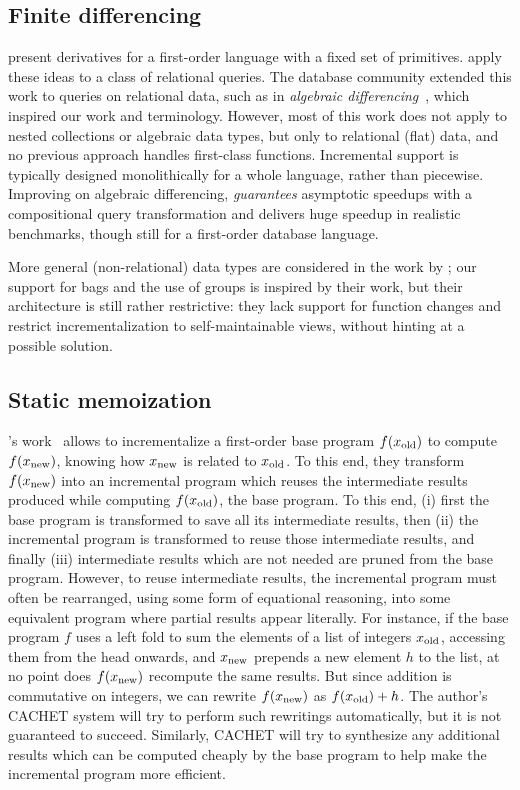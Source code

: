 \subsection{Finite differencing}
\label{sec:finite-diff}
\citet{Paige82FDC} present derivatives for a first-order language
with a fixed set of primitives.
\citet{Blakeley:1986:EUM} apply these ideas to a class of relational queries.
The database community extended
this work to queries on relational data, such as in \emph{algebraic
  differencing}~\citep{Gupta99MMV}, which inspired our work and
terminology. However, most of this work does not apply to nested
collections or algebraic data types, but only to relational
(flat) data, and no previous approach handles first-class
functions. Incremental support is typically designed
monolithically for a whole language, rather than piecewise.
Improving on algebraic differencing, \citet{Koch10IQE}
\emph{guarantees} asymptotic speedups with a compositional query
transformation and delivers huge speedup in realistic benchmarks,
though still for a first-order database language.

More general (non-relational) data types are considered in the work by \citet{GlucheGrust97Incr};
our support for bags and the use of groups is inspired by their work,
but their architecture is still rather restrictive: they lack
support for function changes and restrict incrementalization to
self-maintainable views, without hinting at a possible solution.

\subsection{Static memoization}
\label{ssec:staticmemo}
\citeauthor{Liu00}'s work~\citep{Liu00} allows to incrementalize a first-order base
program $f(x_{\textrm{old}})$ to compute $f(x_{\textrm{new}})$, knowing how
$x_{\textrm{new}}$ is related to $x_{\textrm{old}}$. To this end, they transform
$f(x_{\textrm{new}})$ into an incremental program which reuses the
intermediate results produced while computing $f(x_{\textrm{old}})$, the
base program. To this end, (i) first the base program is
transformed to save all its intermediate results, then (ii) the
incremental program is transformed to reuse those intermediate
results, and finally (iii) intermediate results which are not
needed are pruned from the base program. However, to reuse
intermediate results, the incremental program must often be
rearranged, using some form of equational reasoning, into some
equivalent program where partial results appear literally. For
instance, if the base program $f$ uses a left fold to sum the
elements of a list of integers $x_{\textrm{old}}$, accessing them from the
head onwards, and $x_{\textrm{new}}$ prepends a new element $h$ to the
list, at no point does $f(x_{\textrm{new}})$ recompute the same results.
But since addition is commutative on integers, we can rewrite
$f(x_{\textrm{new}})$ as $f(x_{\textrm{old}}) + h$. The author's CACHET system will
try to perform such rewritings automatically, but it is not
guaranteed to succeed. Similarly, CACHET will try to synthesize
any additional results which can be computed cheaply by the base
program to help make the incremental program more efficient.

